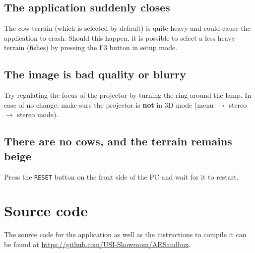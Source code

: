 \documentclass[12pt]{article}
\begin{document}
\subsection{The application suddenly closes}

The cow terrain (which is selected by default) is quite heavy and could cause the application to crash.
Should this happen, it is possible to select a less heavy terrain (fishes) by pressing the F3 button in setup mode.

\subsection{The image is bad quality or blurry}

Try regulating the focus of the projector by turning the ring around the lamp. In case of no change,
make sure the projector is \textbf{not} in 3D mode (menu $\rightarrow$ stereo $\rightarrow$ stereo mode).

\subsection{There are no cows, and the terrain remains beige}

Press the \texttt{RESET} button on the front side of the PC and wait for it to restart.


\section{Source code}\label{sec:code}

The source code for the application as well as the instructions to compile it can be found at \url{https://github.com/USI-Showroom/ARSandbox}.
\end{document}
